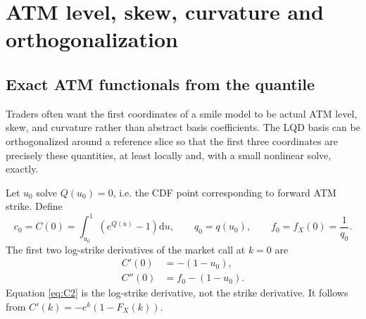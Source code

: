 \documentclass[11pt]{article}
\newcommand{\dd}{\mathrm{d}}
\newcommand{\1}{\mathbf{1}}
\begin{document}
\section{ATM level, skew, curvature and orthogonalization}

\subsection{Exact ATM functionals from the quantile}

Traders often want the first coordinates of a smile model to be actual ATM level, skew, and curvature rather than abstract basis coefficients.  The LQD basis can be orthogonalized around a reference slice so that the first three coordinates are precisely these quantities, at least locally and, with a small nonlinear solve, exactly.

Let $u_0$ solve $Q(u_0)=0$, i.e. the CDF point corresponding to forward ATM strike.  Define
\begin{equation}
    c_0=C(0)=\int_{u_0}^{1}(e^{Q(u)}-1)\dd u,
    \qquad
    q_0=q(u_0),
    \qquad
    f_0=f_X(0)=\frac{1}{q_0}.\label{eq:atm_price_quantities}
\end{equation}
The first two log-strike derivatives of the market call at $k=0$ are
\begin{align}
    C'(0)&=-(1-u_0),\label{eq:C1}\\
    C''(0)&=f_0-(1-u_0).\label{eq:C2}
\end{align}
Equation \eqref{eq:C2} is the log-strike derivative, not the strike derivative.  It follows from $C'(k)=-e^k(1-F_X(k))$.
\end{document}
